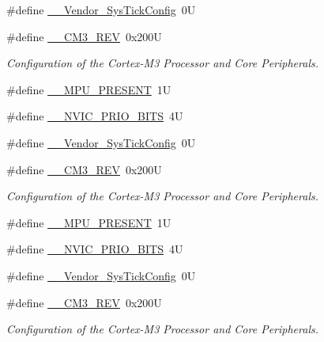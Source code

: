 \begin{DoxyCompactItemize}
\item 
\#define \hyperlink{group___configuration__section__for___c_m_s_i_s_gab58771b4ec03f9bdddc84770f7c95c68}{\-\_\-\-\_\-\-Vendor\-\_\-\-Sys\-Tick\-Config}~0\-U
\item 
\#define \hyperlink{group___configuration__section__for___c_m_s_i_s_gac6a3f185c4640e06443c18b3c8d93f53}{\-\_\-\-\_\-\-C\-M3\-\_\-\-R\-E\-V}~0x200\-U
\begin{DoxyCompactList}\small\item\em Configuration of the Cortex-\/\-M3 Processor and Core Peripherals. \end{DoxyCompactList}\item 
\#define \hyperlink{group___configuration__section__for___c_m_s_i_s_ga4127d1b31aaf336fab3d7329d117f448}{\-\_\-\-\_\-\-M\-P\-U\-\_\-\-P\-R\-E\-S\-E\-N\-T}~1\-U
\item 
\#define \hyperlink{group___configuration__section__for___c_m_s_i_s_gae3fe3587d5100c787e02102ce3944460}{\-\_\-\-\_\-\-N\-V\-I\-C\-\_\-\-P\-R\-I\-O\-\_\-\-B\-I\-T\-S}~4\-U
\item 
\#define \hyperlink{group___configuration__section__for___c_m_s_i_s_gab58771b4ec03f9bdddc84770f7c95c68}{\-\_\-\-\_\-\-Vendor\-\_\-\-Sys\-Tick\-Config}~0\-U
\item 
\#define \hyperlink{group___configuration__section__for___c_m_s_i_s_gac6a3f185c4640e06443c18b3c8d93f53}{\-\_\-\-\_\-\-C\-M3\-\_\-\-R\-E\-V}~0x200\-U
\begin{DoxyCompactList}\small\item\em Configuration of the Cortex-\/\-M3 Processor and Core Peripherals. \end{DoxyCompactList}\item 
\#define \hyperlink{group___configuration__section__for___c_m_s_i_s_ga4127d1b31aaf336fab3d7329d117f448}{\-\_\-\-\_\-\-M\-P\-U\-\_\-\-P\-R\-E\-S\-E\-N\-T}~1\-U
\item 
\#define \hyperlink{group___configuration__section__for___c_m_s_i_s_gae3fe3587d5100c787e02102ce3944460}{\-\_\-\-\_\-\-N\-V\-I\-C\-\_\-\-P\-R\-I\-O\-\_\-\-B\-I\-T\-S}~4\-U
\item 
\#define \hyperlink{group___configuration__section__for___c_m_s_i_s_gab58771b4ec03f9bdddc84770f7c95c68}{\-\_\-\-\_\-\-Vendor\-\_\-\-Sys\-Tick\-Config}~0\-U
\item 
\#define \hyperlink{group___configuration__section__for___c_m_s_i_s_gac6a3f185c4640e06443c18b3c8d93f53}{\-\_\-\-\_\-\-C\-M3\-\_\-\-R\-E\-V}~0x200\-U
\begin{DoxyCompactList}\small\item\em Configuration of the Cortex-\/\-M3 Processor and Core Peripherals. \end{DoxyCompactList}\item 

\end{DoxyCompactItemize}
